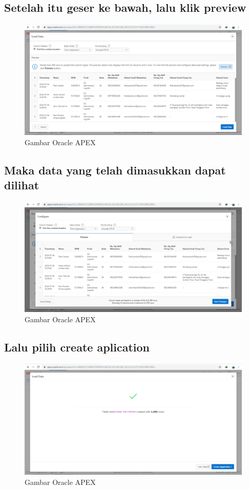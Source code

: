 \documentclass[12pt, times new roman, a4paper]{article}
\begin{document}
\subsection{Setelah itu geser ke bawah, lalu klik preview}
\begin{figure}[h]
	\centering
		\includegraphics[scale=0.2]{gambar/6}
	\caption{Gambar Oracle APEX}
\end{figure}

\subsection{Maka data yang telah dimasukkan dapat dilihat}
\begin{figure}[h]
	\centering
		\includegraphics[scale=0.2]{gambar/7}
	\caption{Gambar Oracle APEX}
\end{figure}

\subsection{Lalu pilih create aplication}
\begin{figure}[h]
	\centering
		\includegraphics[scale=0.3]{gambar/8}
	\caption{Gambar Oracle APEX}
\end{figure}
\end{document}
